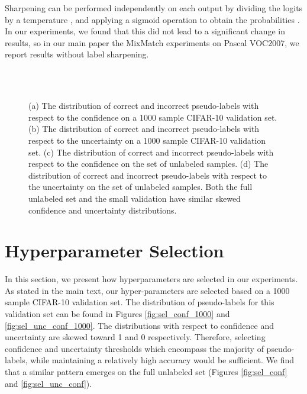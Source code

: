 \documentclass{article} \usepackage{iclr2021_conference,times}
\begin{document}
 Sharpening can be performed independently on each output by dividing the logits by a temperature , and applying a sigmoid operation to obtain the probabilities . In our experiments, we found that this did not lead to a significant change in results, so in our main paper the MixMatch experiments on Pascal VOC2007, we report results without label sharpening. 




\begin{figure}\centering
    
    \\
    \\
    
    
    \caption{(a) The distribution of correct and incorrect pseudo-labels with respect to the confidence on a 1000 sample CIFAR-10 validation set. (b) The distribution of correct and incorrect pseudo-labels with respect to the uncertainty on a 1000 sample CIFAR-10 validation set. (c) The distribution of correct and incorrect pseudo-labels with respect to the confidence on the set of unlabeled samples. (d) The distribution of correct and incorrect pseudo-labels with respect to the uncertainty on the set of unlabeled samples.  Both the full unlabeled set and the small validation have similar skewed confidence and uncertainty distributions.}
    \label{fig:example}\end{figure}


\section{Hyperparameter Selection}
\label{sec:hyperparam}


In this section, we present how hyperparameters are selected in our experiments. As stated in the main text, our hyper-parameters are selected based on a 1000 sample CIFAR-10 validation set. The distribution of pseudo-labels for this validation set can be found in Figures \ref{fig:sel_conf_1000} and \ref{fig:sel_unc_conf_1000}. The distributions with respect to confidence and uncertainty are skewed toward 1 and 0 respectively. Therefore, selecting confidence and uncertainty thresholds which encompass the majority of pseudo-labels, while maintaining a relatively high accuracy would be sufficient. We find that a similar pattern emerges on the full unlabeled set (Figures \ref{fig:sel_conf} and \ref{fig:sel_unc_conf}). 
\end{document}
